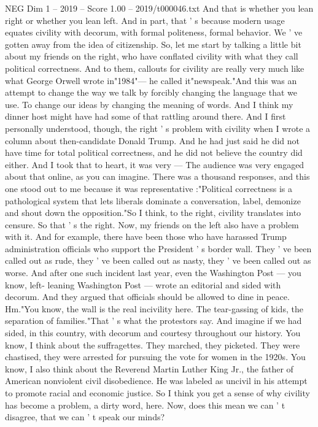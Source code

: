 \begin{textsample}{NEG Dim 1 – 2019 – Score 1.00 – 2019/t000046.txt}
And that is whether you lean right or whether you lean left.
And in part, that ' s because modern usage equates civility with decorum, with formal politeness, formal behavior.
We ' ve gotten away from the idea of citizenship.
So, let me start by talking a little bit about my friends on the right, who have conflated civility with what they call political correctness.
And to them, callouts for civility are really very much like what George Orwell wrote in"1984"— he called it"newspeak."And this was an attempt to change the way we talk by forcibly changing the language that we use.
To change our ideas by changing the meaning of words.
And I think my dinner host might have had some of that rattling around there.
And I first personally understood, though, the right ' s problem with civility when I wrote a column about then-candidate Donald Trump.
And he had just said he did not have time for total political correctness, and he did not believe the country did either.
And I took that to heart, it was very — The audience was very engaged about that online, as you can imagine.
There was a thousand responses, and this one stood out to me because it was representative :"Political correctness is a pathological system that lets liberals dominate a conversation, label, demonize and shout down the opposition."So I think, to the right, civility translates into censure.
So that ' s the right.
Now, my friends on the left also have a problem with it.
And for example, there have been those who have harassed Trump administration officials who support the President ' s border wall.
They ' ve been called out as rude, they ' ve been called out as nasty, they ' ve been called out as worse.
And after one such incident last year, even the Washington Post — you know, left- leaning Washington Post — wrote an editorial and sided with decorum.
And they argued that officials should be allowed to dine in peace.
Hm."You know, the wall is the real incivility here.
The tear-gassing of kids, the separation of families."That ' s what the protestors say.
And imagine if we had sided, in this country, with decorum and courtesy throughout our history.
You know, I think about the suffragettes.
They marched, they picketed.
They were chastised, they were arrested for pursuing the vote for women in the 1920s.
You know, I also think about the Reverend Martin Luther King Jr., the father of American nonviolent civil disobedience.
He was labeled as uncivil in his attempt to promote racial and economic justice.
So I think you get a sense of why civility has become a problem, a dirty word, here.
Now, does this mean we can ' t disagree, that we can ' t speak our minds?

\end{textsample}
